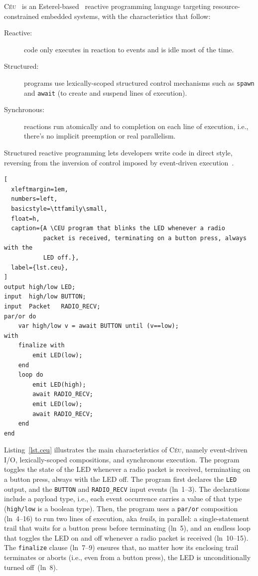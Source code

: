 \documentclass[sigplan,10pt,review,anonymous]{acmart}\settopmatter{printfolios=true,printccs=false,printacmref=false}
\newcommand{\CEU}{\textsc{C\'{e}u}\xspace}
\newcommand{\code}[1] {{\small{\texttt{#1}}}}
\begin{document}
\CEU~\cite{ceu.sensys13} is an Esterel-based~\cite{esterel.ieee91}
reactive
programming language targeting resource-constrained embedded systems, with the
characteristics that follow:
%
\begin{description}
\item [Reactive:] code only executes in reaction to events and is idle most of
    the time.
\item [Structured:] programs use lexically-scoped structured control
    mechanisms such as \code{spawn} and \code{await} (to create and suspend
    lines of execution).
\item [Synchronous:] reactions run atomically and to completion on each line of
    execution, i.e., there's no implicit preemption or real parallelism.
\end{description}

Structured reactive programming lets developers write code in direct style,
reversing from the inversion of control imposed by event-driven
execution~\cite{rp.deprecating,rp.rescala,sync_async.cooperative}.

\begin{lstlisting}[
  xleftmargin=1em,
  numbers=left,
  basicstyle=\ttfamily\small,
  float=h,
  caption={A \CEU program that blinks the LED whenever a radio
           packet is received, terminating on a button press, always with the
           LED off.},
  label={lst.ceu},
]
output high/low LED;
input  high/low BUTTON;
input  Packet   RADIO_RECV;
par/or do
    var high/low v = await BUTTON until (v==low);
with
    finalize with
        emit LED(low);
    end
    loop do
        emit LED(high);
        await RADIO_RECV;
        emit LED(low);
        await RADIO_RECV;
    end
end
\end{lstlisting}

Listing~\ref{lst.ceu} illustrates the main characteristics of \CEU, namely
event-driven I/O, lexically-scoped compositions, and synchronous execution.
%
The program toggles the state of the LED whenever a radio packet is received,
terminating on a button press, always with the LED off.
%
The program first declares the \code{LED} output, and the \code{BUTTON} and
\code{RADIO\_RECV} input events (ln~1--3).
The declarations include a payload type, i.e., each event occurrence carries
a value of that type (\code{high/low} is a boolean type).
%
Then, the program uses a \code{par/or} composition (ln~4--16) to run two lines
of execution, aka \emph{trails}, in parallel:
a single-statement trail that waits for a button press before terminating
(ln~5), and an endless loop that toggles the LED on and off whenever a radio
packet is received (ln~10--15).
The \code{finalize} clause (ln~7--9) ensures that, no matter how its enclosing
trail terminates or aborts (i.e., even from a button press), the LED is
unconditionally turned off~(ln~8).
\end{document}
